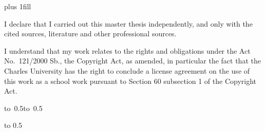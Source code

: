 \newpage



\openright
\hypersetup{pageanchor=true}
\pagestyle{plain}
\vglue 0pt plus 1fill

\noindent
I declare that I carried out this master thesis independently, and only with the cited
sources, literature and other professional sources.

\medskip\noindent
I understand that my work relates to the rights and obligations under the Act No.~121/2000 Sb.,
the Copyright Act, as amended, in particular the fact that the Charles
University has the right to conclude a license agreement on the use of this
work as a school work pursuant to Section 60 subsection 1 of the Copyright Act.

\vspace{10mm}

\hbox{\hbox to 0.5\hbox to 0.5}

\vspace{20mm}
\newpage


\openright

\vbox to 0.5

\newpage


\openright

\noindent
\Dedication

\newpage

\openright
\pagestyle{plain}
\setcounter{page}{1}
